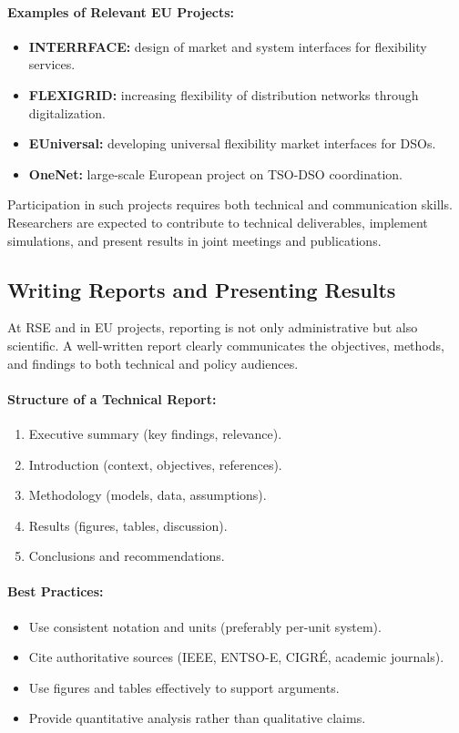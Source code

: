 \documentclass[11pt]{article}
\begin{document}
	\paragraph{Examples of Relevant EU Projects:}
	\begin{itemize}
		\item \textbf{INTERRFACE:} design of market and system interfaces for flexibility services.
		\item \textbf{FLEXIGRID:} increasing flexibility of distribution networks through digitalization.
		\item \textbf{EUniversal:} developing universal flexibility market interfaces for DSOs.
		\item \textbf{OneNet:} large-scale European project on TSO-DSO coordination.
	\end{itemize}
	
	Participation in such projects requires both technical and communication skills.  
	Researchers are expected to contribute to technical deliverables, implement simulations, and present results in joint meetings and publications.
	
	
	\subsection{Writing Reports and Presenting Results}
	
	At RSE and in EU projects, reporting is not only administrative but also scientific.  
	A well-written report clearly communicates the objectives, methods, and findings to both technical and policy audiences.
	
	\paragraph{Structure of a Technical Report:}
	\begin{enumerate}
		\item Executive summary (key findings, relevance).
		\item Introduction (context, objectives, references).
		\item Methodology (models, data, assumptions).
		\item Results (figures, tables, discussion).
		\item Conclusions and recommendations.
	\end{enumerate}
	
	\paragraph{Best Practices:}
	\begin{itemize}
		\item Use consistent notation and units (preferably per-unit system).
		\item Cite authoritative sources (IEEE, ENTSO-E, CIGRÉ, academic journals).
		\item Use figures and tables effectively to support arguments.
		\item Provide quantitative analysis rather than qualitative claims.
	\end{itemize}
	
\end{document}
